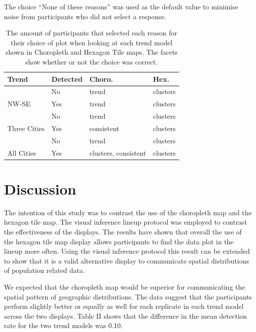 \documentclass{monashthesis}
\begin{document}
The choice ``None of these reasons'' was used as the default value to minimise noise from participants who did not select a response.

\begin{table}[!h]

\caption{\label{tab:reason}The amount of participants that selected each reason for their choice of plot when looking at each trend model shown in Choropleth and Hexagon Tile maps. The facets show whether or not the choice was correct.}
\centering
\begin{tabular}[t]{llll}
\toprule
Trend & Detected & Choro. & Hex.\\
\midrule
 & No & trend & clusters\\
\cmidrule{2-4}
\multirow{-2}{*}{\raggedright\arraybackslash NW-SE} & Yes & trend & clusters\\
\cmidrule{1-4}
 & No & trend & clusters\\
\cmidrule{2-4}
\multirow{-2}{*}{\raggedright\arraybackslash Three Cities} & Yes & consistent & clusters\\
\cmidrule{1-4}
 & No & trend & clusters\\
\cmidrule{2-4}
\multirow{-2}{*}{\raggedright\arraybackslash All Cities} & Yes & clusters, consistent & clusters\\
\bottomrule
\end{tabular}
\end{table}

\hypertarget{discussion}{%
\section{Discussion}\label{discussion}}

The intention of this study was to contrast the use of the choropleth map and the hexagon tile map.
The visual inference lineup protocol was employed to contrast the effectiveness of the displays.
The results have shown that overall the use of the hexagon tile map display allows participants to find the data plot in the lineup more often.
Using the visual inference protocol this result can be extended to show that it is a valid alternative display to communicate spatial distributions of population related data.

We expected that the choropleth map would be superior for communicating the spatial pattern of geographic distributions. The data suggest that the participants perform slightly better or equally as well for each replicate in each trend model across the two displays. Table II shows that the difference in the mean detection rate for the two trend models was 0.10.
\end{document}
